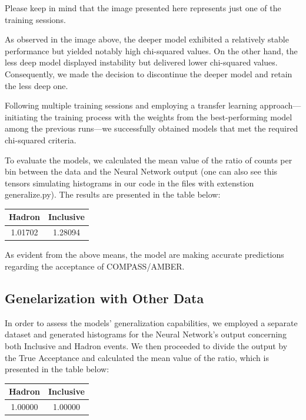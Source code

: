 \documentclass{article}
\begin{document}
Please keep in mind that the image presented here represents just one of the training sessions.

As observed in the image above, the deeper model exhibited a relatively stable performance but yielded notably high chi-squared values. On the other hand, the less deep model displayed instability but delivered lower chi-squared values. Consequently, we made the decision to discontinue the deeper model and retain the less deep one.

Following multiple training sessions and employing a transfer learning approach—initiating the training process with the weights from the best-performing model among the previous runs—we successfully obtained models that met the required chi-squared criteria.

To evaluate the models, we calculated the mean value of the ratio of counts per bin between the data and the Neural Network output (one can also see this tensors simulating histograms in our code in the files with extenstion generalize.py). The results are presented in the table below:

\begin{table}[H]
    \centering
    \begin{tabular}{c|c}
    \textbf{Hadron} & \textbf{Inclusive} \\ \hline
    1.01702 & 1.28094 \\
    \end{tabular}
\end{table}


As evident from the above means, the model are making accurate predictions regarding the acceptance of COMPASS/AMBER.


\subsection{Genelarization with Other Data}
In order to assess the models' generalization capabilities, we employed a separate dataset and generated histograms for the Neural Network's output concerning both Inclusive and Hadron events.
We then proceeded to divide the output by the True Acceptance and calculated the mean value of the ratio, which is presented in the table below:

\begin{table}[H]
    \centering
    \begin{tabular}{c|c}
    \textbf{Hadron} & \textbf{Inclusive} \\ \hline
    1.00000 & 1.00000 \\
    \end{tabular}
\end{table}
\end{document}
